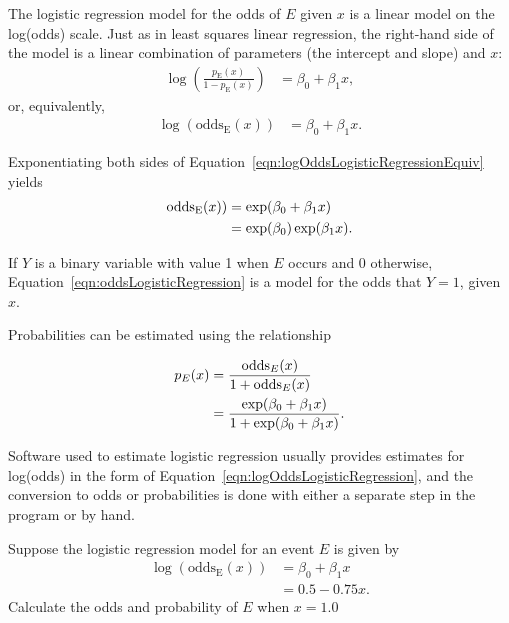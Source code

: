 The logistic regression model for the odds of $E$ given $x$ is a linear model on the log(odds) scale. Just as in least squares linear regression, the right-hand side of the model is a linear combination of parameters (the intercept and slope) and $x$: 
\begin{align}
   \log\left(\frac{p_{\text{E}}(x)}
  {1 - p_\text{E}(x)}\right) &= \beta_0 + \beta_1 x,
  \label{eqn:logOddsLogisticRegression}
\end{align}
or, equivalently,
\begin{align}
 \log(\text{odds}_\text{E}(x)) &= \beta_0 + \beta_1 x.
   \label{eqn:logOddsLogisticRegressionEquiv}
\end{align}

Exponentiating both sides of Equation~\ref{eqn:logOddsLogisticRegressionEquiv} yields
\begin{align}
  \text{odds}_\text{E}(x)) &= \exp(\beta_0 + \beta_1 x) \notag \\
  &= \exp(\beta_0) \exp(\beta_1 x).
    \label{eqn:oddsLogisticRegression}
\end{align}

If $Y$ is a binary variable with value 1 when $E$ occurs and 0 otherwise,
Equation~\ref{eqn:oddsLogisticRegression} is a model for the odds that $Y = 1$, given $x$.

Probabilities can be estimated using the relationship

\begin{align}
  p_{E}(x) &= \frac{\text{odds}_{E}(x)}{1 + \text{odds}_{E}(x)} \notag \\
        &= \frac{\exp(\beta_0 + \beta_1 x)}
        { 1 + \exp(\beta_0 + \beta_1 x)}.
        \label{eqn:probLogisticRegression}
 \end{align}

Software used to estimate logistic regression usually provides estimates for log(odds) in the form of Equation~\ref{eqn:logOddsLogisticRegression}, and the conversion to odds or probabilities is done with either a separate step in the program or by hand.

\begin{exercisewrap}
\begin{nexercise}\label{guidedPracticeSimpleModel}
Suppose the logistic regression model for an event $E$ is given by
\begin{align*}
\log(\text{odds}_\text{E}(x)) &= \beta_0 + \beta_1 x \\
             &= 0.5 - 0.75x.
\end{align*}
Calculate the odds and probability of $E$ when $x = 1.0$
\footnotemark{}
\end{nexercise}
\end{exercisewrap}

